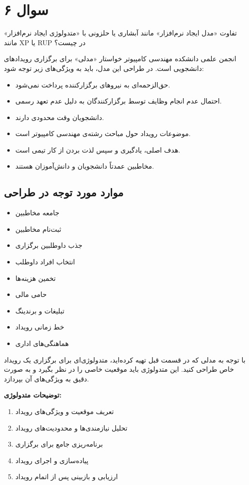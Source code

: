 \section*{سوال ۶}

تفاوت «مدل ایجاد نرم‌افزار» مانند آبشاری یا حلزونی با «متدولوژی ایجاد نرم‌افزار» مانند XP یا RUP در چیست؟

انجمن علمی دانشکده مهندسی کامپیوتر خواستار «مدلی» برای برگزاری رویدادهای دانشجویی است. در طراحی این مدل، باید به ویژگی‌های زیر توجه شود:
\begin{itemize}
	\item حق‌الزحمه‌ای به نیروهای برگزارکننده پرداخت نمی‌شود.
	\item احتمال عدم انجام وظایف توسط برگزارکنندگان به دلیل عدم تعهد رسمی.
	\item دانشجویان وقت محدودی دارند.
	\item موضوعات رویداد حول مباحث رشته‌ی مهندسی کامپیوتر است.
	\item هدف اصلی، یادگیری و سپس لذت بردن از کار تیمی است.
	\item مخاطبین عمدتاً دانشجویان و دانش‌آموزان هستند.
\end{itemize}

\subsection*{موارد مورد توجه در طراحی}
\begin{itemize}
	\item جامعه مخاطبین
	\item ثبت‌نام مخاطبین
	\item جذب داوطلبین برگزاری
	\item انتخاب افراد داوطلب
	\item تخمین هزینه‌ها
	\item حامی مالی
	\item تبلیغات و برندینگ
	\item خط زمانی رویداد
	\item هماهنگی‌های اداری
\end{itemize}

با توجه به مدلی که در قسمت قبل تهیه کرده‌اید، متدولوژی‌ای برای برگزاری یک رویداد خاص طراحی کنید. این متدولوژی باید موقعیت خاصی را در نظر بگیرد و به صورت دقیق به ویژگی‌های آن بپردازد.

\textbf{توضیحات متدولوژی:} 
\begin{enumerate}
	\item تعریف موقعیت و ویژگی‌های رویداد
	\item تحلیل نیازمندی‌ها و محدودیت‌های رویداد
	\item برنامه‌ریزی جامع برای برگزاری
	\item پیاده‌سازی و اجرای رویداد
	\item ارزیابی و بازبینی پس از اتمام رویداد
\end{enumerate}

